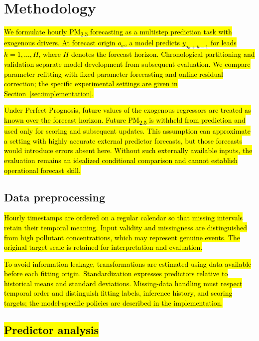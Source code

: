 \documentclass[pdflatex,sn-basic,Numbered]{sn-jnl}
\newcommand{\rev}[1]{\hl{#1}}
\begin{document}
\section{Methodology}\label{sec:methodology}

\rev{We formulate hourly PM\textsubscript{2.5} forecasting as a multistep prediction task with exogenous drivers. At forecast origin $o_w$, a model predicts $y_{o_w+h-1}$ for leads $h=1,\ldots,H$, where $H$ denotes the forecast horizon. Chronological partitioning and validation separate model development from subsequent evaluation. We compare parameter refitting with fixed-parameter forecasting and online residual correction; the specific experimental settings are given in Section~\ref{sec:implementation}.}

\rev{Under Perfect Prognosis, future values of the exogenous regressors are treated as known over the forecast horizon. Future PM\textsubscript{2.5} is withheld from prediction and used only for scoring and subsequent updates. This assumption can approximate a setting with highly accurate external predictor forecasts, but those forecasts would introduce errors absent here. Without such externally available inputs, the evaluation remains an idealized conditional comparison and cannot establish operational forecast skill.}

\subsection{Data preprocessing}\label{subsec:preprocessing}

\rev{Hourly timestamps are ordered on a regular calendar so that missing intervals retain their temporal meaning. Input validity and missingness are distinguished from high pollutant concentrations, which may represent genuine events. The original target scale is retained for interpretation and evaluation.}

\rev{To avoid information leakage, transformations are estimated using data available before each fitting origin. Standardization expresses predictors relative to historical means and standard deviations. Missing-data handling must respect temporal order and distinguish fitting labels, inference history, and scoring targets; the model-specific policies are described in the implementation.}

\subsection{\texorpdfstring{\rev{Predictor analysis}}{Predictor analysis}}\label{subsec:feature_selection}
\end{document}
